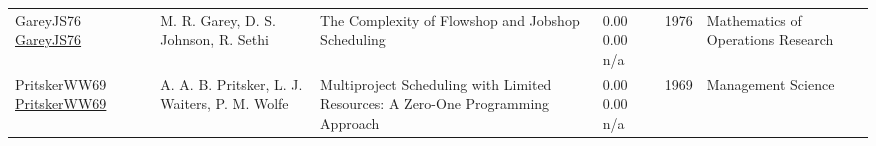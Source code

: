 {\begin{longtable}{p{3cm}p{5cm}p{10cm}p{1cm}rp{2.5cm}l}
GareyJS76 \href{http://dx.doi.org/10.1287/moor.1.2.117}{GareyJS76} & M. R. Garey, D. S. Johnson, R. Sethi & The Complexity of Flowshop and Jobshop Scheduling & \noindent{}\textcolor{black!50}{0.00} \textcolor{black!50}{0.00} n/a & 1976 & Mathematics of Operations Research & \cite{GareyJS76}\\
PritskerWW69 \href{http://dx.doi.org/10.1287/mnsc.16.1.93}{PritskerWW69} & A. A. B. Pritsker, L. J. Waiters, P. M. Wolfe & Multiproject Scheduling with Limited Resources: A Zero-One Programming Approach & \noindent{}\textcolor{black!50}{0.00} \textcolor{black!50}{0.00} n/a & 1969 & Management Science & \cite{PritskerWW69}\\
\end{longtable}
}

